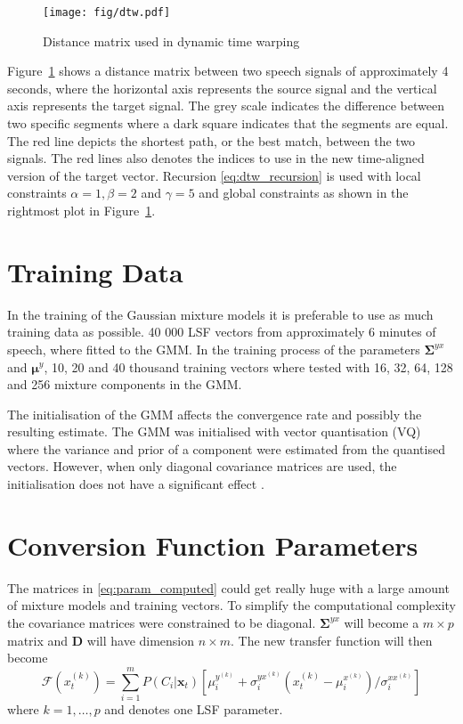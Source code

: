 \begin{figure}[htbp]
	\begin{center}
		\texttt{[image: fig/dtw.pdf]}
		\caption{Distance matrix used in dynamic time warping}
		\label{fig:dtw}
	\end{center}
\end{figure}
Figure~\ref{fig:dtw} shows a distance matrix between two speech signals of approximately 4 seconds, where the horizontal axis represents the source signal and the vertical axis represents the target signal. The grey scale indicates the difference between two specific segments where a dark square indicates that the segments are equal. The red line depicts the shortest path, or the best match, between the two signals. The red lines also denotes the indices to use in the new time-aligned version of the target vector. Recursion \eqref{eq:dtw_recursion} is used with local constraints $\alpha=1, \beta=2$ and $\gamma=5$ and global constraints as shown in the rightmost plot in Figure~\ref{fig:dtw}.

\section{Training Data} %
\label{sec:training_data}
In the training of the Gaussian mixture models it is preferable to use as much training data as possible. 40 000 LSF vectors from approximately 6 minutes of speech, where fitted to the GMM. In the training process of the parameters $\mathbf{\Sigma}^{yx}$ and $\boldsymbol{\mu}^y$, 10, 20 and 40 thousand training vectors where tested with 16, 32, 64, 128 and 256 mixture components in the GMM.

The initialisation of the GMM affects the convergence rate and possibly the resulting estimate. The GMM was initialised with vector quantisation (VQ) where the variance and prior of a component were estimated from the quantised vectors. However, when only diagonal covariance matrices are used, the initialisation does not have a significant effect \cite{reynolds93}.

\section{Conversion Function Parameters} %
\label{sec:conversion_function_parameters}
The matrices in \eqref{eq:param_computed} could get really huge with a large amount of mixture models and training vectors. To simplify the computational complexity the covariance matrices were constrained to be diagonal. $\mathbf{\Sigma}^{yx}$ will become a $m\times p$ matrix and $\mathbf{D}$ will have dimension $n\times m$. The new transfer function will then become
\begin{equation}
	\mathcal{F}(x_t^{(k)}) = \sum_{i=1}^{m}P(C_i \vert \mathbf{x}_t)[\mu_i^{y^{(k)}}+\sigma_i^{yx^{(k)}}  (x_t^{(k)}-\mu_i^{x^{(k)}})/\sigma_i^{xx^{(k)}}]
\end{equation}
where $k=1,\dots,p$ and denotes one LSF parameter.

